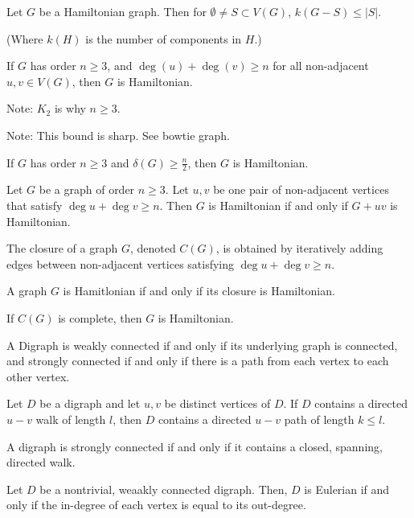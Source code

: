 \documentclass{article}
\begin{document}
    Let $G$ be a Hamiltonian graph. Then for $\emptyset \neq S \subset V(G)$, $k(G-S) \leq |S|$.

    (Where $k(H)$ is the number of components in $H$.)

\medskip{}

    If $G$ has order $n \geq 3$, and $\deg(u) + \deg(v) \geq n$ for all non-adjacent $u,v \in V(G)$, then $G$ is Hamiltonian.

    Note: $K_2$ is why $n \geq 3$.

    Note: This bound is sharp. See bowtie graph.

\medskip{}

    If $G$ has order $n \geq 3$ and $\delta(G) \geq \frac n2$, then $G$ is Hamiltonian.

\medskip{}

    Let $G$ be a graph of order $n \geq 3$. Let $u,v$ be one pair of non-adjacent vertices that satisfy $\deg u + \deg v \geq n$. Then $G$ is Hamiltonian if and only if $G+uv$ is Hamiltonian. 

\medskip{}

    The closure of a graph $G$, denoted $C(G)$, is obtained by iteratively adding edges between non-adjacent vertices satisfying $\deg u + \deg  v \geq n$.

\medskip{}

    A graph $G$ is Hamitlonian if and only if its closure is Hamiltonian.

\medskip{}

    If $C(G)$ is complete, then $G$ is Hamiltonian.

\medskip{}

    A Digraph is weakly connected if and only if its underlying graph is connected, and strongly connected if and only if there is a path from each vertex to each other vertex.

\medskip{}

    Let $D$ be a digraph and let $u,v$ be distinct vertices of $D$. If $D$ contains a directed $u-v$ walk of length $l$, then $D$ contains a directed $u-v$ path of length $k \leq l$.

\medskip{}

    A digraph is strongly connected if and only if it contains a closed, spanning, directed walk.

\medskip{}

    Let $D$ be a nontrivial, weaakly connected digraph. Then, $D$ is Eulerian if and only if the in-degree of each vertex is equal to its out-degree.
\end{document}
